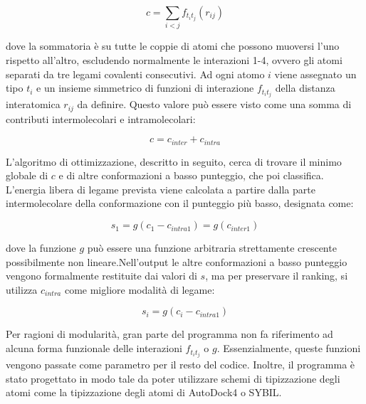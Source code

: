 \begin{equation}
    c = \sum_{i<j}f_{t_it_j}(r_{ij})
\end{equation}

dove la sommatoria è su tutte le coppie di atomi che possono muoversi l'uno rispetto all'altro, escludendo normalmente le interazioni 1-4, ovvero gli atomi separati da tre legami covalenti consecutivi. Ad ogni atomo $i$ viene assegnato un tipo $t_i$ e un insieme simmetrico di funzioni di interazione $f_{t_it_j}$ della distanza interatomica $r_{ij}$ da definire.\newline
Questo valore può essere visto come una somma di contributi intermolecolari e intramolecolari:

\begin{equation}
    c = c_{inter} + c_{intra}
\end{equation}

L'algoritmo di ottimizzazione, descritto in seguito, cerca di trovare il minimo globale di $c$ e di altre conformazioni a basso punteggio, che poi classifica.\newline 
L'energia libera di legame prevista viene calcolata a partire dalla parte intermolecolare della conformazione con il punteggio più basso, designata come:

\begin{equation}
    s_1 = g(c_1 - c_{intra1}) = g(c_{inter1})
\end{equation}

dove la funzione $g$ può essere una funzione arbitraria strettamente crescente possibilmente non lineare.\newline Nell'output le altre conformazioni a basso punteggio vengono formalmente restituite dai valori di $s$, ma per preservare il ranking, si utilizza $c_{intra}$ come migliore modalità di legame:

\begin{equation}
    s_i = g(c_i - c_{intra1})
\end{equation}

Per ragioni di modularità, gran parte del programma non fa riferimento ad alcuna forma funzionale delle interazioni $f_{t_it_j}$ o $g$. Essenzialmente, queste funzioni vengono passate come parametro per il resto del codice. Inoltre, il programma è stato progettato in modo tale da poter utilizzare schemi di tipizzazione degli atomi come la tipizzazione degli atomi di AutoDock4 o SYBIL.\newline

